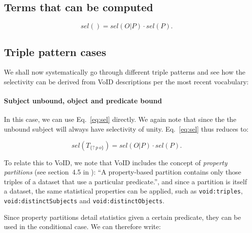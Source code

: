 \documentclass[12pt, draft]{article}
\newcommand{\rdfterm}[1]{\texttt{#1}}
\begin{document}
\subsection{Terms that can be computed}



\begin{equation}\label{eq:selsubjun}
sel() = sel(O | P) \cdot sel(P) . 
\end{equation}


\subsection{Triple pattern cases}

We shall now systematically go through different triple patterns and
see how the selectivity can be derived from VoID descriptions per the
most recent vocabulary\cite{voidnote}:

\paragraph{Subject unbound, object and predicate bound}

In this case, we can use Eq.~\ref{eq:sel} directly. We again note that
since the the unbound subject will always have selectivity of
unity.
Eq.~\ref{eq:sel} thus reduces to:

\begin{equation}\label{eq:selsubjun}
sel(T_{\{?~p~o\}}) = sel(O | P) \cdot sel(P) . 
\end{equation}

To relate this to VoID, we note that VoID includes the concept of
\emph{property partitions} (see section~4.5 in \cite{voidnote}): ``A
property-based partition contains only those triples of a dataset that
use a particular predicate.'', and since a partition is itself a
dataset, the same statistical properties can be applied, such as
\rdfterm{void:triples}, \rdfterm{void:distinctSubjects} and
\rdfterm{void:distinctObjects}. 

Since property partitions detail statistics given a certain predicate,
they can be used in the conditional case. We can therefore write:
\end{document}
